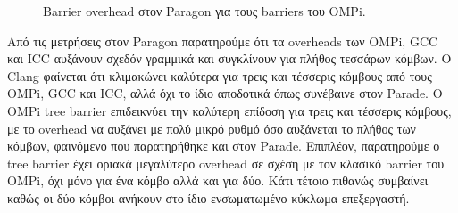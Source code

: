 \begin{figure}
\begin{minipage}{0.48\textwidth}
        \caption{Barrier overhead στον Paragon για τους barriers του OMPi.}
        \label{fig:bo-paragon-default-places-ompionly}
    \end{minipage}
\end{figure}


%
%

Από τις μετρήσεις στον Paragon παρατηρούμε ότι τα overheads των OMPi, GCC και ICC αυξάνουν σχεδόν γραμμικά και συγκλίνουν για πλήθος τεσσάρων κόμβων. Ο Clang φαίνεται ότι κλιμακώνει καλύτερα για τρεις και τέσσερις κόμβους από τους OMPi, GCC και ICC, αλλά όχι το ίδιο αποδοτικά όπως συνέβαινε στον Parade. Ο OMPi tree barrier επιδεικνύει την καλύτερη επίδοση για τρεις και τέσσερις κόμβους, με το overhead να αυξάνει με πολύ μικρό ρυθμό όσο αυξάνεται το πλήθος των κόμβων, φαινόμενο που παρατηρήθηκε και στον Parade. Επιπλέον, παρατηρούμε ο tree barrier έχει οριακά μεγαλύτερο overhead σε σχέση με τον κλασικό barrier του OMPi, όχι μόνο για ένα κόμβο αλλά και για δύο. Κάτι τέτοιο πιθανώς συμβαίνει καθώς οι δύο κόμβοι ανήκουν στο ίδιο ενσωματωμένο κύκλωμα επεξεργαστή.



